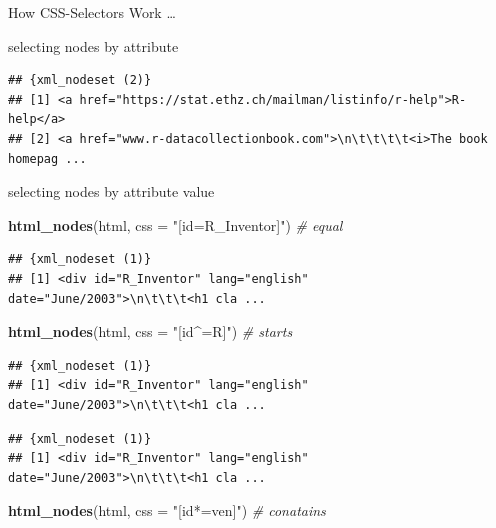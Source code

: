 \documentclass[ignorenonframetext,]{beamer}
\newenvironment{Shaded}{\begin{snugshade}}{\end{snugshade}}
\newcommand{\KeywordTok}[1]{\textcolor[rgb]{0.13,0.29,0.53}{\textbf{{#1}}}}
\newcommand{\DataTypeTok}[1]{\textcolor[rgb]{0.13,0.29,0.53}{{#1}}}
\newcommand{\StringTok}[1]{\textcolor[rgb]{0.31,0.60,0.02}{{#1}}}
\newcommand{\CommentTok}[1]{\textcolor[rgb]{0.56,0.35,0.01}{\textit{{#1}}}}
\newcommand{\NormalTok}[1]{{#1}}
\begin{document}
\begin{frame}[fragile]{How CSS-Selectors Work \ldots{}}
\begin{block}{selecting nodes by attribute}
\begin{verbatim}
## {xml_nodeset (2)}
## [1] <a href="https://stat.ethz.ch/mailman/listinfo/r-help">R-help</a>
## [2] <a href="www.r-datacollectionbook.com">\n\t\t\t\t<i>The book homepag ...
\end{verbatim}

\end{block}

\begin{block}{selecting nodes by attribute value}

\begin{Shaded}
\begin{Highlighting}[]
\KeywordTok{html_nodes}\NormalTok{(html, }\DataTypeTok{css =} \StringTok{"[id=R_Inventor]"}\NormalTok{) }\CommentTok{# equal}
\end{Highlighting}
\end{Shaded}

\begin{verbatim}
## {xml_nodeset (1)}
## [1] <div id="R_Inventor" lang="english" date="June/2003">\n\t\t\t<h1 cla ...
\end{verbatim}

\begin{Shaded}
\begin{Highlighting}[]
\KeywordTok{html_nodes}\NormalTok{(html, }\DataTypeTok{css =} \StringTok{"[id^=R]"}\NormalTok{)         }\CommentTok{# starts }
\end{Highlighting}
\end{Shaded}

\begin{verbatim}
## {xml_nodeset (1)}
## [1] <div id="R_Inventor" lang="english" date="June/2003">\n\t\t\t<h1 cla ...
\end{verbatim}

\begin{Shaded}
\end{Shaded}

\begin{verbatim}
## {xml_nodeset (1)}
## [1] <div id="R_Inventor" lang="english" date="June/2003">\n\t\t\t<h1 cla ...
\end{verbatim}

\begin{Shaded}
\begin{Highlighting}[]
\KeywordTok{html_nodes}\NormalTok{(html, }\DataTypeTok{css =} \StringTok{"[id*=ven]"}\NormalTok{)       }\CommentTok{# conatains}
\end{Highlighting}
\end{Shaded}


\end{block}
\end{frame}
\end{document}
